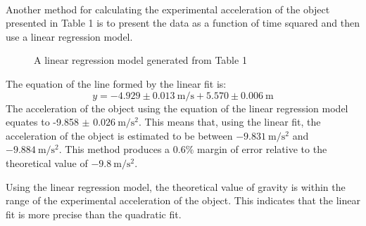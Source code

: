 \documentclass[12pt]{article}
\begin{document}
\paragraph{}

Another method for calculating the experimental acceleration of the object presented in Table 1 is to present the data as a function of time squared and then use a linear regression model.

\begin{figure}[H]
    \centering

    \caption[10pt]{A linear regression model generated from Table 1}


\end{figure}

The equation of the line formed by the linear fit is:
\[y= -4.929 \pm \SI{0.013}{\metre\per\second} + 5.570 \pm \SI{0.006}{\metre}\]
The acceleration of the object using the equation of the linear regression model equates to -9.858 $\pm$ $\SI{0.026}{\metre\per\second\squared}$. This means that, using the linear fit, the acceleration of the object is estimated to be between $\SI{-9.831}{\metre\per\second\squared}$ and $\SI{-9.884}{\metre\per\second\squared}$. This method produces a $0.6\%$ margin of error relative to the theoretical value of $\SI{-9.8}{\metre\per\second\squared}$.

Using the linear regression model, the theoretical value of gravity is within the range of the experimental acceleration of the object. This indicates that the linear fit is more precise than the quadratic fit.
\end{document}
